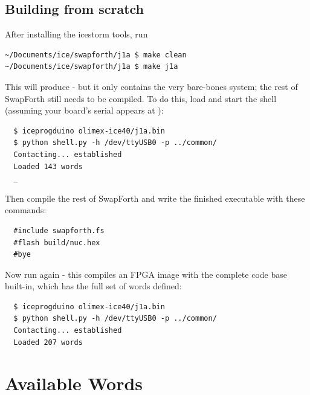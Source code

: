 

\newpage
\section{Building from scratch}

After installing the icestorm tools, run

\begin{Verbatim}
~/Documents/ice/swapforth/j1a $ make clean
~/Documents/ice/swapforth/j1a $ make j1a
\end{Verbatim}

\noindent
This will produce  - but it only contains the very bare-bones system;
the rest of SwapForth still needs to be compiled.
To do this, load  and start the shell
(assuming your board's serial appears at ):

\begin{framed}
\begin{Verbatim}
  $ iceprogduino olimex-ice40/j1a.bin
  $ python shell.py -h /dev/ttyUSB0 -p ../common/
  Contacting... established
  Loaded 143 words
  _
\end{Verbatim}
\end{framed}

Then compile the rest of SwapForth and write the finished executable with these commands:

\begin{framed}
\begin{Verbatim}
  #include swapforth.fs
  #flash build/nuc.hex
  #bye
\end{Verbatim}
\end{framed}

Now run  again - this compiles an FPGA image with the complete code base built-in,
which has the full set of words defined:

\begin{framed}
\begin{Verbatim}
  $ iceprogduino olimex-ice40/j1a.bin
  $ python shell.py -h /dev/ttyUSB0 -p ../common/
  Contacting... established
  Loaded 207 words
\end{Verbatim}
\end{framed}


\chapter{Available Words}

